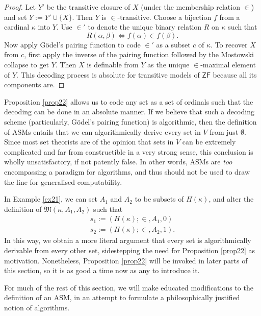 \documentclass[12pt]{article}
\numberwithin{equation}{section}
\begin{document}
\begin{proof}
Let $Y'$ be the transitive closure of $X$ (under the membership relation $\in$) and set $Y := Y' \cup \{X\}$. Then $Y$ is $\in$-transitive. Choose a bijection $f$ from a cardinal $\kappa$ into $Y$. Use $\in'$ to denote the unique binary relation $R$ on $\kappa$ such that
\begin{equation*}
    R(\alpha, \beta) \iff f(\alpha) \in f(\beta) \text{.}
\end{equation*}
Now apply G\"{o}del's pairing function to code $\in'$ as a subset $c$ of $\kappa$. To recover $X$ from $c$, first apply the inverse of the pairing function followed by the Mostowski collapse to get $Y$. Then $X$ is definable from $Y$ as the unique $\in$-maximal element of $Y$. This decoding process is absolute for transitive models of $\mathsf{ZF}$ because all its components are.
\end{proof}

Proposition \ref{prop22} allows us to code any set as a set of ordinals such that the decoding can be done in an absolute manner. If we believe that such a decoding scheme (particularly, G\"{o}del's pairing function) is algorithmic, then the definition of ASMs entails that we can algorithmically derive every set in $V$ from just $\emptyset$. Since most set theorists are of the opinion that sets in $V$ can be extremely complicated and far from constructible in a very strong sense, this conclusion is wholly unsatisfactory, if not patently false. In other words, ASMs are \emph{too} encompassing a paradigm for algorithms, and thus should not be used to draw the line for generalised computability.

\begin{rem}
In Example \ref{ex21}, we can set $A_1$ and $A_2$ to be subsets of $H(\kappa)$, and alter the definition of $\mathfrak{M}(\kappa, A_1, A_2)$ such that 
\begin{gather*}
    s_1 := (H(\kappa); \in, A_1, 0) \\
    s_2 := (H(\kappa); \in, A_2, 1) \text{.}
\end{gather*}
In this way, we obtain a more literal argument that every set is algorithmically derivable from every other set, sidestepping the need for Proposition \ref{prop22} as motivation. Nonetheless, Proposition \ref{prop22} will be invoked in later parts of this section, so it is as good a time now as any to introduce it.
\end{rem}

For much of the rest of this section, we will make educated modifications to the definition of an ASM, in an attempt to formulate a philosophically justified notion of algorithms.
\end{document}
